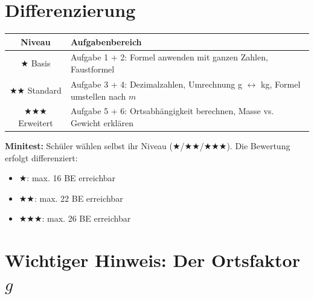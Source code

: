 \documentclass[a4paper,11pt]{article}
\newcommand{\stern}{$\bigstar$}
\begin{document}
\vspace{5mm}


\section*{Differenzierung}

\begin{tabularx}{\textwidth}{|c|X|}
\hline
\textbf{Niveau} & \textbf{Aufgabenbereich} \\
\hline
\stern{} Basis & Aufgabe 1 + 2: Formel anwenden mit ganzen Zahlen, Faustformel \\
\hline
\stern\stern{} Standard & Aufgabe 3 + 4: Dezimalzahlen, Umrechnung g $\leftrightarrow$ kg, Formel umstellen nach $m$ \\
\hline
\stern\stern\stern{} Erweitert & Aufgabe 5 + 6: Ortsabhängigkeit berechnen, Masse vs. Gewicht erklären \\
\hline
\end{tabularx}

\vspace{3mm}

\textbf{Minitest:} Schüler wählen selbst ihr Niveau (\stern/\stern\stern/\stern\stern\stern). Die Bewertung erfolgt differenziert:
\begin{itemize}[nosep]
    \item \stern: max. 16 BE erreichbar
    \item \stern\stern: max. 22 BE erreichbar
    \item \stern\stern\stern: max. 26 BE erreichbar
\end{itemize}

\vspace{5mm}


\section*{Wichtiger Hinweis: Der Ortsfaktor $g$}
\end{document}

